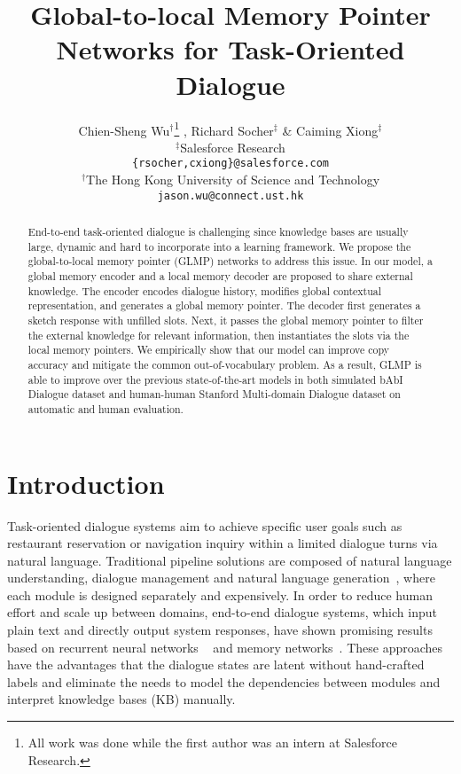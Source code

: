 \documentclass{article} \usepackage{iclr2019_conference,times}
\title{Global-to-local Memory Pointer Networks for Task-Oriented Dialogue}
\author{Chien-Sheng Wu$^\dag$\thanks{All work was done while the first author was an intern at Salesforce Research.} , Richard Socher$^\ddag$ \& Caiming Xiong$^\ddag$ \\
$^\ddag$Salesforce Research \\
\texttt{\{rsocher,cxiong\}@salesforce.com} \\
$^\dag$The Hong Kong University of Science and Technology \\
\texttt{jason.wu@connect.ust.hk} \\
}
\begin{document}
\maketitle

\begin{abstract}
End-to-end task-oriented dialogue is challenging since knowledge bases are usually large, dynamic and hard to incorporate into a learning framework. We propose the global-to-local memory pointer (GLMP) networks to address this issue. In our model, a global memory encoder and a local memory decoder are proposed to share external knowledge. The encoder encodes dialogue history, modifies global contextual representation, and generates a global memory pointer. The decoder first generates a sketch response with unfilled slots. Next, it passes the global memory pointer to filter the external knowledge for relevant information, then instantiates the slots via the local memory pointers. We empirically show that our model can improve copy accuracy and mitigate the common out-of-vocabulary problem. As a result, GLMP is able to improve over the previous state-of-the-art models in both simulated bAbI Dialogue dataset and human-human Stanford Multi-domain Dialogue dataset on automatic and human evaluation.






\end{abstract}

\section{Introduction}
Task-oriented dialogue systems aim to achieve specific user goals such as restaurant reservation or navigation inquiry within a limited dialogue turns via natural language. Traditional pipeline solutions are composed of natural language understanding, dialogue management and natural language generation~\citep{young2013pomdp,wen2016network}, where each module is designed separately and expensively. In order to reduce human effort and scale up between domains, end-to-end dialogue systems, which input plain text and directly output system responses, have shown promising results based on recurrent neural networks ~\citep{zhao2017generative,lei2018sequicity} and memory networks~\citep{sukhbaatar2015end}. These approaches have the advantages that the dialogue states are latent without hand-crafted labels and eliminate the needs to model the dependencies between modules and interpret knowledge bases (KB) manually.
\end{document}
